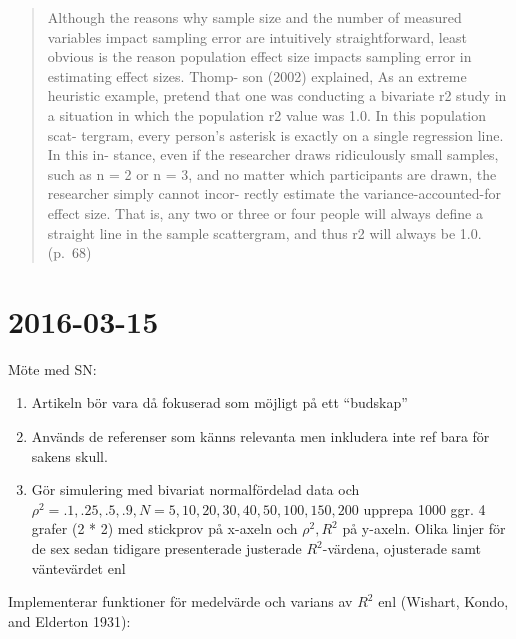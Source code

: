 \documentclass[]{article}
\providecommand{\tightlist}{%
  \setlength{\itemsep}{0pt}\setlength{\parskip}{0pt}}
\begin{document}
\begin{quote}
Although the reasons why sample size and the number of measured
variables impact sampling error are intuitively straightforward, least
obvious is the reason population effect size impacts sampling error in
estimating effect sizes. Thomp- son (2002) explained, As an extreme
heuristic example, pretend that one was conducting a bivariate r2 study
in a situation in which the population r2 value was 1.0. In this
population scat- tergram, every person's asterisk is exactly on a single
regression line. In this in- stance, even if the researcher draws
ridiculously small samples, such as n = 2 or n = 3, and no matter which
participants are drawn, the researcher simply cannot incor- rectly
estimate the variance-accounted-for effect size. That is, any two or
three or four people will always define a straight line in the sample
scattergram, and thus r2 will always be 1.0. (p.~68)
\end{quote}

\section{2016-03-15}\label{section-1}

Möte med SN:

\begin{enumerate}
\def\labelenumi{\arabic{enumi}.}
\tightlist
\item
  Artikeln bör vara då fokuserad som möjligt på ett ``budskap''
\item
  Används de referenser som känns relevanta men inkludera inte ref bara
  för sakens skull.
\item
  Gör simulering med bivariat normalfördelad data och
  \(\rho^2 = .1, .25, .5, .9, N = 5, 10, 20, 30, 40, 50, 100, 150, 200\)
  upprepa 1000 ggr. 4 grafer (2 * 2) med stickprov på x-axeln och
  \(\rho^2, R^2\) på y-axeln. Olika linjer för de sex sedan tidigare
  presenterade justerade \(R^2\)-värdena, ojusterade samt väntevärdet
  enl
\end{enumerate}

Implementerar funktioner för medelvärde och varians av \(R^2\) enl
(Wishart, Kondo, and Elderton 1931):
\end{document}
